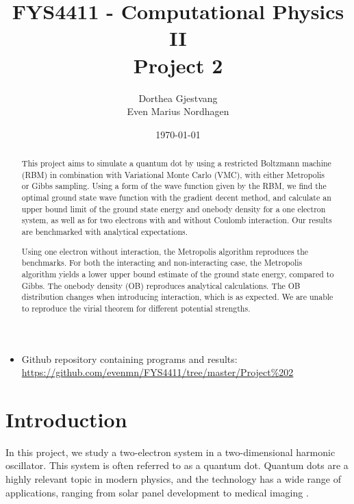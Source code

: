 \documentclass[norsk,a4paper,12pt]{article}
\title{FYS4411 - Computational Physics II\\\vspace{2mm} \Large{Project 2}}
\author{\large Dorthea Gjestvang\\ Even Marius Nordhagen}
\date\today
\begin{document}
\maketitle

\begin{itemize}
\item Github repository containing programs and results: \\\url{https://github.com/evenmn/FYS4411/tree/master/Project%202}
\end{itemize}

\begin{abstract}
This project aims to simulate a quantum dot by using a restricted Boltzmann machine (RBM) in combination with Variational Monte Carlo (VMC), with either Metropolis or Gibbs sampling. Using a form of the wave function given by the RBM, we find the optimal ground state wave function with the gradient decent method, and calculate an upper bound limit of the ground state energy and onebody density for a one electron system, as well as for two electrons with and without Coulomb interaction. Our results are benchmarked with analytical expectations. 
\par 

Using one electron without interaction, the Metropolis algorithm reproduces the benchmarks. For both the interacting and non-interacting case, the Metropolis algorithm yields a lower upper bound estimate of the ground state energy, compared to Gibbs. The onebody density (OB) reproduces analytical calculations. The OB distribution changes when introducing interaction, which is as expected. We are unable to reproduce the virial theorem for different potential strengths.
\end{abstract}


\newpage

\tableofcontents

\newpage

\section{Introduction} \label{sec:Introduction}
In this project, we study a two-electron system in a two-dimensional harmonic oscillator. This system is often referred to as a quantum dot. Quantum dots are a highly relevant topic in modern physics, and the technology has a wide range of applications, ranging from solar panel development to medical imaging \cite{Chilton}.
\par 
\vspace{3mm}
\end{document}

